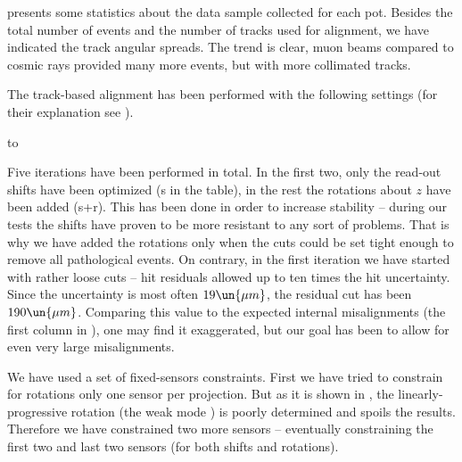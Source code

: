  presents some statistics about the data sample collected for each pot. Besides the total number of events and the number of tracks used for alignment, we have indicated the track angular spreads. The trend is clear, muon beams compared to cosmic rays provided many more events, but with more collimated tracks.


The track-based alignment has been performed with the following settings (for their explanation see ).

\hbox to

\noindent Five iterations have been performed in total. In the first two, only the read-out shifts have been optimized (s in the table), in the rest the rotations about $z$ have been added (s+r). This has been done in order to increase stability -- during our  tests the shifts have proven to be more resistant to any sort of problems. That is why we have added the rotations only when the cuts could be set tight enough to remove all pathological events. On contrary, in the first iteration we have started with rather loose cuts -- hit residuals allowed up to ten times the hit uncertainty. Since the uncertainty is most often $19\un{\mu m}$, the residual cut has been $190\un{\mu m}$. Comparing this value to the expected internal misalignments (the first column in ), one may find it exaggerated, but our goal has been to allow for even very large misalignments.


We have used a set of fixed-sensors constraints. First we have tried to constrain for rotations only one sensor per projection. But as it is shown in , the linearly-progressive rotation (the weak mode ) is poorly determined and spoils the results. Therefore we have constrained two more sensors -- eventually constraining the first two and last two sensors (for both shifts and rotations).

